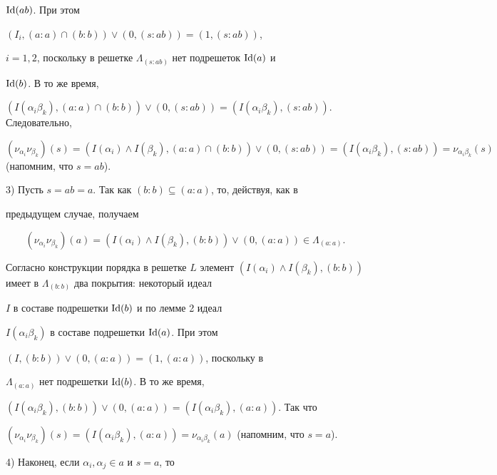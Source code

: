 $\operatorname{Id}(ab)$. При этом


$(I_i,(a:a)\cap(b:b))\vee(0,(s:ab))=(1,(s:ab))$,


$i=1,2$, поскольку в решетке $\Lambda_{(s:ab)}$ нет подрешеток $\operatorname{Id}(a)$ и


$\operatorname{Id}(b)$. В то же время,


$(I(\alpha_i\beta_k),(a:a)\cap(b:b))\vee(0,(s:ab))=


(I(\alpha_i\beta_k),(s:ab))$. Следовательно,


$(\nu_{\alpha_i}\nu_{\beta_k})(s)=(I(\alpha_i)\wedge


I(\beta_k),(a:a)\cap


(b:b))\vee(0,(s:ab))=(I(\alpha_i\beta_k),(s:ab))=


\nu_{\alpha_i\beta_k}(s)$ (напомним, что $s=ab$).





3) Пусть $s=ab=a$. Так как $(b:b)\subseteq (a:a)$, то, действуя, как в


предыдущем случае, получаем


$$


(\nu_{\alpha_i}\nu_{\beta_k})(a)=(I(\alpha_i)\wedge I(\beta_k),(b:b))


\vee(0,(a:a))\in\Lambda_{(a:a)}.


$$


Согласно конструкции порядка в решетке $L$ элемент $(I(\alpha_i)\wedge


I(\beta_k),(b:b))$ имеет в $\Lambda_{(b:b)}$ два покрытия: некоторый идеал


$I$ в составе подрешетки $\operatorname{Id}(b)$ и по лемме 2 идеал


$I(\alpha_i\beta_k)$ в составе подрешетки $\operatorname{Id}(a)$. При этом


$(I,(b:b))\vee (0,(a:a))=(1,(a:a))$, поскольку в


$\Lambda_{(a:a)}$ нет подрешетки $\operatorname{Id}(b)$. В то же время,


$(I(\alpha_i\beta_k),(b:b))\vee(0,(a:a))=


(I(\alpha_i\beta_k),(a:a))$. Так что


$(\nu_{\alpha_i}\nu_{\beta_k})(s)=(I(\alpha_i\beta_k),(a:a))=


\nu_{\alpha_i\beta_k}(a)$ (напомним, что $s=a$).





4) Наконец, если $\alpha_i,\alpha_j\in a$ и $s=a$, то


$$


